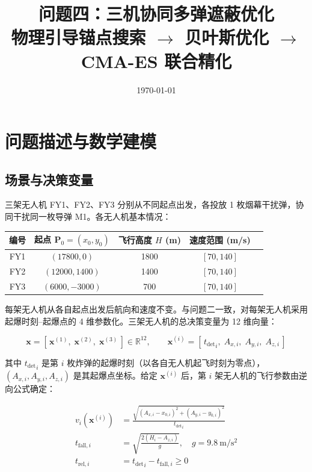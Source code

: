\documentclass[12pt,a4paper]{ctexart}
\title{\textbf{问题四：三机协同多弹遮蔽优化}\\[5pt]
       \large 物理引导锚点搜索 $\to$ 贝叶斯优化 $\to$ CMA-ES 联合精化}
\author{}
\date{\today}
\newcommand{\tdet}{t_{\text{det}}}
\newcommand{\R}{\mathbb{R}}
\begin{document}
\maketitle

\section{问题描述与数学建模}

\subsection{场景与决策变量}

三架无人机 FY1、FY2、FY3 分别从不同起点出发，各投放 1 枚烟幕干扰弹，协同干扰同一枚导弹 M1。各无人机基本情况：

\begin{center}
\begin{tabular}{c|c|c|c|c}
\toprule
\textbf{编号} & \textbf{起点 $\mathbf{P}_0 = (x_0, y_0)$} & \textbf{飞行高度 $H$ (m)} & \textbf{速度范围 (m/s)} \\
\midrule
FY1 & $(17800, 0)$    & 1800 & $[70, 140]$ \\
FY2 & $(12000, 1400)$ & 1400 & $[70, 140]$ \\
FY3 & $(6000, -3000)$ & 700  & $[70, 140]$ \\
\bottomrule
\end{tabular}
\end{center}

每架无人机从各自起点出发后航向和速度不变。与问题二一致，对每架无人机采用起爆时刻--起爆点的 4 维参数化。三架无人机的总决策变量为 12 维向量：

\begin{equation}
\boxed{\mathbf{x} = [\,\mathbf{x}^{(1)},\; \mathbf{x}^{(2)},\; \mathbf{x}^{(3)}\,] \in \R^{12}}, \qquad
\boxed{\mathbf{x}^{(i)} = [\,{\tdet}_i,\; A_{x,i},\; A_{y,i},\; A_{z,i}\,]}
\end{equation}

其中 ${\tdet}_i$ 是第 $i$ 枚炸弹的起爆时刻（以各自无人机起飞时刻为零点），$(A_{x,i}, A_{y,i}, A_{z,i})$ 是其起爆点坐标。给定 $\mathbf{x}^{(i)}$ 后，第 $i$ 架无人机的飞行参数由逆向公式确定：

\begin{align}
v_i(\mathbf{x}^{(i)}) &= \frac{\sqrt{(A_{x,i} - x_{0,i})^2 + (A_{y,i} - y_{0,i})^2}}{{\tdet}_i} \label{eq:vi} \\
t_{\text{fall},i} &= \sqrt{\frac{2(H_i - A_{z,i})}{g}}, \quad g = 9.8\ \mathrm{m/s^2} \label{eq:tfall-i} \\
t_{\text{rel},i} &= {\tdet}_i - t_{\text{fall},i} \geq 0 \label{eq:trel-i}
\end{align}
\end{document}
